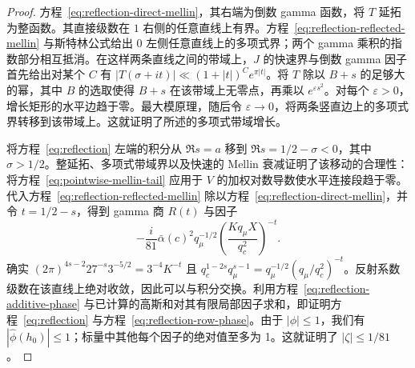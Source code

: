 \documentclass[11pt,a4paper]{article}
\numberwithin{equation}{section}
\numberwithin{figure}{section}
\theoremstyle{definition}
\theoremstyle{remark}
\begin{document}
\begin{proof}
方程~\eqref{eq:reflection-direct-mellin}，其右端为倒数 gamma 函数，将 $T$ 延拓为整函数。其直接级数在 $1$ 右侧的任意直线上有界。方程~\eqref{eq:reflection-reflected-mellin} 与斯特林公式给出 $0$ 左侧任意直线上的多项式界；两个 gamma 乘积的指数部分相互抵消。在这样两条直线之间的带域上，$J$ 的快速界与倒数 gamma 因子首先给出对某个 $C$ 有 $|T(\sigma+it)|\ll (1+|t|)^C e^{\pi|t|}$。将 $T$ 除以 $B+s$ 的足够大的幂，其中 $B$ 的选取使得 $B+s$ 在该带域上无零点，再乘以 $e^{\varepsilon s^2}$。对每个 $\varepsilon>0$，增长矩形的水平边趋于零。最大模原理，随后令 $\varepsilon\to0$，将两条竖直边上的多项式界转移到该带域上。这就证明了所述的多项式带域增长。

将方程~\eqref{eq:reflection} 左端的积分从 $\Re s=a$ 移到 $\Re s=1/2-\sigma<0$，其中 $\sigma>1/2$。整延拓、多项式带域界以及快速的 Mellin 衰减证明了该移动的合理性：将方程~\eqref{eq:pointwise-mellin-tail} 应用于 $V$ 的加权对数导数使水平连接段趋于零。代入方程~\eqref{eq:reflection-reflected-mellin} 除以方程~\eqref{eq:reflection-direct-mellin}，并令 $t=1/2-s$，得到 gamma 商 $R(t)$ 与因子
\[
 -\frac i{81}\bar\alpha(c)^2q_\mu^{-1/2}
       \left(\frac{Kq_\mu X}{q_c^2}\right)^{-t}.
\]
确实 $(2\pi)^{4s-2}27^{-s}3^{-5/2}
=3^{-4}K^{-t}$ 且 $q_c^{1-2s}q_\mu^{s-1}
=q_\mu^{-1/2}(q_\mu/q_c^2)^{-t}$。反射系数级数在该直线上绝对收敛，因此可以与积分交换。利用方程~\eqref{eq:reflection-additive-phase} 与已计算的高斯和对其有限局部因子求和，即证明方程~\eqref{eq:reflection} 与方程~\eqref{eq:reflection-row-phase}。由于 $|\phi|\le1$，我们有 $|\widehat\phi(h_0)|\le1$；标量中其他每个因子的绝对值至多为 1。这就证明了 $|\zeta|\le1/81$。


\end{proof}
\end{document}
